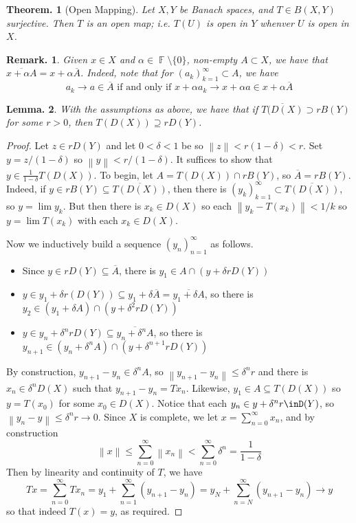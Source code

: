 \documentclass[11pt, a4paper]{memoir}
\DeclareMathOperator{\F}{{\mathbb{F}}}
\newcommand{\norm}[1]{\ensuremath{\left\lVert#1\right\rVert}}
\theoremstyle{change}
\newtheorem{theorem}{Theorem.}[section]
\newtheorem{lemma}[theorem]{Lemma.}
\theoremstyle{plain}
\theoremstyle{nonumberplain}
\newtheorem{remark}{Remark.}
\newtheorem{proof}{Proof}
\numberwithin{equation}{section}
\begin{document}
\begin{theorem}[Open Mapping]
    Let $X,Y$ be Banach spaces, and $T\in B(X,Y)$ surjective.
    Then $T$ is an open map; i.e. $T(U)$ is open in $Y$ whenver $U$ is open in $X$.
\end{theorem}
\begin{remark}
    Given $x\in X$ and $\alpha\in\F\setminus\{0\}$, non-empty $A\subset X$, we have that $\overline{x+\alpha A}=x+\alpha\overline{A}$.
    Indeed, note that for $(a_k)_{k=1}^\infty\subset A$, we have
    \begin{equation*}
        a_k\to a\in\overline{A}\text{ if and only if }x+\alpha a_k\to x+\alpha a\in x+\alpha\overline{A}
    \end{equation*}
\end{remark}
\begin{lemma}
    With the assumptions as above, we have that if $\overline{T(D(X)}\supset rB(Y)$ for some $r>0$, then $T(D(X))\supseteq rD(Y)$.
\end{lemma}
\begin{proof}
    Let $z\in rD(Y)$ and let $0<\delta<1$ be so $\norm{z}<r(1-\delta)<r$.
    Set $y=z/(1-\delta)$ so $\norm{y}<r/(1-\delta)$.
    It suffices to show that $y\in\frac{1}{1-\delta}T(D(X))$.
    To begin, let $A=T(D(X))\cap rB(Y)$, so $\overline{A}=rB(Y)$.
    Indeed, if $y\in rB(Y)\subseteq\overline{T(D(X))}$, then there is $(y_k)_{k=1}^\infty\subset\overline{T(D(X))}$, so $y=\lim y_k$.
    But then there is $x_k\in D(X)$ so each $\norm{y_k-T(x_k)}<1/k$ so $y=\lim T(x_k)$ with each $x_k\in D(X)$.

    Now we inductively build a sequence $(y_n)_{n=1}^\infty$ as follows.
    \begin{itemize}[nl]
        \item Since $y\in rD(Y)\subseteq\overline{A}$, there is $y_1\in A\cap(y+\delta rD(Y))$
        \item $y\in y_1+\delta r(D(Y))\subseteq y_1+\delta\overline{A}=\overline{y_1+\delta A}$, so there is $y_2\in(y_1+\delta A)\cap (y+\delta^2rD(Y))$
        \item $y\in y_n+\delta^n rD(Y)\subseteq\overline{y_n+\delta^nA}$, so there is $y_{n+1}\in(y_n+\delta^n A)\cap(y+\delta^{n+1}rD(Y))$
    \end{itemize}
    By construction, $y_{n+1}-y_n\in\delta^n A$, so $\norm{y_{n+1}-y_n}\leq\delta^n r$ and there is $x_n\in\delta^n D(X)$ such that $y_{n+1}-y_n=Tx_n$.
    Likewise, $y_1\in A\subseteq T(D(X))$ so $y=T(x_0)$ for some $x_0\in D(X)$.
    Notice that each $y_n\in y+\delta^nr\inD(Y)$, so $\norm{y_n-y}\leq\delta^n r\to 0$.
    Since $X$ is complete, we let $x=\sum_{n=0}^\infty x_n$, and by construction
    \begin{equation*}
        \norm{x}\leq\sum_{n=0}^\infty\norm{x_n}<\sum_{n=0}^\infty\delta^n=\frac{1}{1-\delta}
    \end{equation*}
    Then by linearity and continuity of $T$, we have
    \begin{equation*}
        Tx=\sum_{n=0}^\infty Tx_n=y_1+\sum_{n=1}^\infty(y_{n+1}-y_n)=y_N+\sum_{n=N}^\infty(y_{n+1}-y_n)\to y
    \end{equation*}
    so that indeed $T(x)=y$, as required.
\end{proof}
\end{document}
